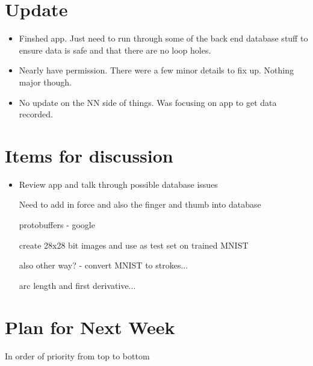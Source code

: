 \documentclass[]{weekly-report}
\begin{document}

\def\studentname{Philip Corr}
\def\projecttitle{ConvNets for iOS Gesture Recognition Applications}
\def\ucdstudentnumber{12318581}
\def\weeklyreportnumber{8}
\maketitle


\section{Update}

\begin{itemize}

\item Finshed app. Just need to run through some of the back end database stuff to ensure data is safe and that there are no loop holes.

\item Nearly have permission. There were a few minor details to fix up. Nothing major though.

\item No update on the NN side of things. Was focusing on app to get data recorded.
	
\end{itemize}

\section{Items for discussion}

\begin{itemize}
\item Review app and talk through possible database issues

Need to add in force and also the finger and thumb into database

protobuffers - google

create 28x28 bit images and use as test set on trained MNIST

also other way? - convert MNIST to strokes...

arc length and first derivative...
 

\end{itemize}

\section{Plan for Next Week}
In order of priority from top to bottom
\end{document}
